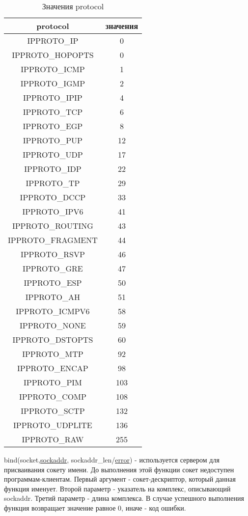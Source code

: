 \documentclass[12t]{article}
\begin{document}
\begin{table}[H]
\caption{\label{protocol}Значения protocol}
\begin{center}
\begin{tabular}{|c|c|}
\hline
protocol & значения \\
\hline
IPPROTO\_IP & 0 \\
IPPROTO\_HOPOPTS & 0 \\
IPPROTO\_ICMP & 1 \\
IPPROTO\_IGMP & 2 \\
IPPROTO\_IPIP & 4 \\
IPPROTO\_TCP & 6 \\
IPPROTO\_EGP & 8 \\
IPPROTO\_PUP & 12 \\
IPPROTO\_UDP & 17 \\
IPPROTO\_IDP & 22 \\
IPPROTO\_TP & 29 \\
IPPROTO\_DCCP & 33 \\
IPPROTO\_IPV6 & 41 \\
IPPROTO\_ROUTING & 43 \\
IPPROTO\_FRAGMENT & 44 \\
IPPROTO\_RSVP & 46 \\
IPPROTO\_GRE & 47 \\
IPPROTO\_ESP & 50 \\
IPPROTO\_AH & 51 \\
IPPROTO\_ICMPV6 & 58 \\
IPPROTO\_NONE & 59 \\
IPPROTO\_DSTOPTS & 60 \\
IPPROTO\_MTP & 92 \\
IPPROTO\_ENCAP & 98 \\
IPPROTO\_PIM & 103 \\
IPPROTO\_COMP & 108 \\
IPPROTO\_SCTP & 132 \\
IPPROTO\_UDPLITE & 136 \\
IPPROTO\_RAW & 255 \\
\hline
\end{tabular}
\end{center}
\end{table}

\label{bind}
bind(socket,\hyperref[sockaddr]{sockaddr}, sockaddr\_len/\hyperref[error]{error}) - используется сервером для присваивания сокету имени. До выполнения этой функции сокет недоступен программам-клиентам. Первый аргумент - сокет-дескриптор, который данная функция именует. Второй параметр - указатель на комплекс, описывающий sockaddr. Третий параметр - длина комплекса. В случае успешного выполнения функция возвращает значение равное 0, иначе - код ошибки.
\end{document}
